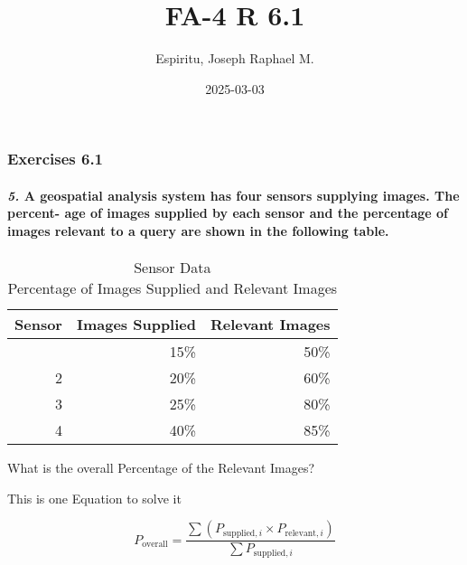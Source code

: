 \documentclass[
]{article}
\title{FA-4 R 6.1}
\author{Espiritu, Joseph Raphael M.}
\date{2025-03-03}
\begin{document}
\maketitle

\subsubsection{\texorpdfstring{\textbf{Exercises
6.1}}{Exercises 6.1}}\label{exercises-6.1}

\paragraph{\texorpdfstring{\textbf{\emph{5.}} A geospatial analysis
system has four sensors supplying images. The percent- age of images
supplied by each sensor and the percentage of images relevant to a query
are shown in the following
table.}{5. A geospatial analysis system has four sensors supplying images. The percent- age of images supplied by each sensor and the percentage of images relevant to a query are shown in the following table.}}\label{a-geospatial-analysis-system-has-four-sensors-supplying-images.-the-percent--age-of-images-supplied-by-each-sensor-and-the-percentage-of-images-relevant-to-a-query-are-shown-in-the-following-table.}

\begin{table}[!t]
\caption*{
{\large Sensor Data} \\ 
{\small Percentage of Images Supplied and Relevant Images}
} 
\fontsize{12.0pt}{14.4pt}\selectfont
\begin{tabular*}{\linewidth}{@{\extracolsep{\fill}}rrr}
\toprule
Sensor & Images Supplied & Relevant Images \\ 
\midrule\addlinespace[2.5pt]
1 & 15\% & 50\% \\ 
2 & 20\% & 60\% \\ 
3 & 25\% & 80\% \\ 
4 & 40\% & 85\% \\ 
\bottomrule
\end{tabular*}
\end{table}

What is the overall Percentage of the Relevant Images?

This is one Equation to solve it

\[
P_{\text{overall}} = \frac{\sum (P_{\text{supplied}, i} \times P_{\text{relevant}, i})}{\sum P_{\text{supplied}, i}}
\]
\end{document}
